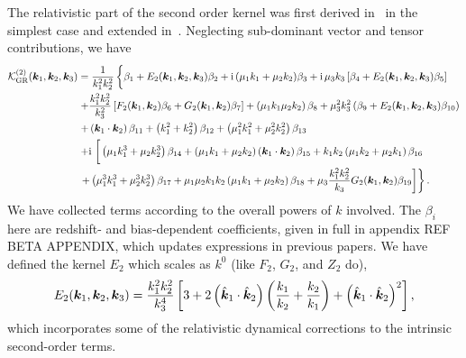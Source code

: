 The relativistic part of the second order kernel was first derived in~\cite{Umeh:2016nuh} in the simplest case and extended in~\cite{Jolicoeur:2017nyt,Jolicoeur:2017eyi,Jolicoeur:2018blf}. Neglecting sub-dominant vector and tensor contributions, we have 
\begin{align}\label{eq:soGRkernel}
\ko_\mathrm{GR}^{(2)}(\ka,\kb,\kc) &= \frac{1}{k_1^2 k_2^2} \left\{ \vphantom{\frac{k_1^2 k_2^2}{k_3}} \beta_1 + E_2(\ka,\kb,\kc) \beta_2 
+\i (\mu_1k_1+\mu_2k_2)\beta_3
+ \i \mu_3 k_3\left[ \beta_{4} + E_2(\ka, \kb, \kc)\beta_{5}\right] \right. \nonumber \\
&\left. +\frac{k_1^2 k_2^2}{k_3^2} \left[ F_2(\ka,\kb) \beta_{6} + G_2(\ka,\kb) \beta_{7} \right] + \left( \mu_1 k_1 \mu_2 k_2 \right)\beta_{8} + \mu_3^2 k_3^2 \left(\beta_{9} + E_2(\ka,\kb,\kc) \beta_{10} \right) \right. \nonumber \\
&\left. + \left(\ka \cdot \kb \right)\beta_{11} + \left( k_1^2 + k_2^2 \right) \beta_{12} + \left( \mu_1^2 k_1^2 + \mu_2^2 k_2^2 \right) \beta_{13} \right. \nonumber \\
&\left. + \i \left[\vphantom{\frac{k_1^2 k_2^2}{k_3}} \left( \mu_1 k_1^3 + \mu_2 k_2^3 \right)\beta_{14} + \left( \mu_1 k_1 + \mu_2 k_2 \right) \left(\ka\cdot\kb \right) \beta_{15} + k_1 k_2 \left(\mu_1 k_2 + \mu_2 k_1 \right) \beta_{16} \right. \right. \nonumber \\
&\left. \left. + \left( \mu_1^3 k_1^3 + \mu_2^3 k_2^3 \right)\beta_{17} + \mu_1 \mu_2 k_1 k_2 \left( \mu_1 k_1 + \mu_2 k_2 \right) \beta_{18} + \mu_3 \frac{k_1^2 k_2^2}{k_3} G_2(\ka,\kb) \beta_{19} \right] \right\}.
\end{align}
We have collected terms according to the overall powers of $k$ involved.
The \(\beta_i\) here are redshift- and bias-dependent coefficients, given in full in appendix  REF BETA APPENDIX, which updates  expressions in previous papers.
We have defined the kernel \(E_2\) which scales as \(k^0\) (like \(F_2\), \(G_2\), and \(Z_2\) do), 
\begin{equation}
E_2(\bm {k}_1,\bm {k}_2,\bm {k}_3) = \frac{k_1^2 k_2^2}{k_3^4} \left[ 3 + 2 \left( \hat{\bm {k}}_1 \cdot\hat{\bm {k}}_2 \right) \left( \frac{k_1}{k_2} + \frac{k_2}{k_1} \right) + \left( \hat{\bm {k}}_1 \cdot \hat{\bm {k}}_2 \right)^2 \right],
\end{equation}
which incorporates some of the relativistic dynamical corrections to the intrinsic second-order terms.


